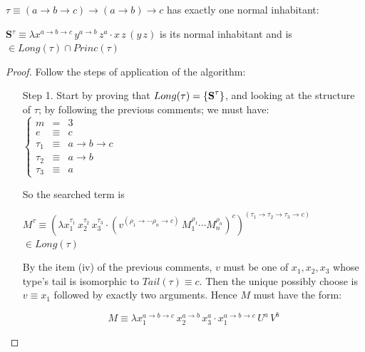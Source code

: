\documentclass[a4paper,10pt]{article}
\begin{document}
\begin{exa}[A type $\tau$ with $\#(\tau) =1$]
$\tau \equiv (a \rightarrow b \rightarrow c) \rightarrow (a\rightarrow b) \rightarrow c$ has exactly one normal inhabitant:
\begin{center}
\textbf{S}$^{\tau} \equiv \lambda x^{a \to b \to c}\,y^{a \to b}\,z^a\cdot x\,z\,(y\,z)$
is its normal inhabitant and is $\in Long(\tau) \cap Princ(\tau)$
\end{center}
\begin{proof} Follow the steps of application of the algorithm:
 \begin{itemize}
  \item[Step 1.] Start by proving that $Long(\tau) = \{\mbox{\textbf{S}}^{\tau}\}$, and looking at the structure of $\tau$; 
  by following the previous comments; we must have:\\[0.2 cm] 
  
			      $\left\{\begin{array}{lcl}
                               m & = & 3 \\
                               e & \equiv & c \\
                               \tau_1 & \equiv & a \to b \to c \\
                               \tau_2 & \equiv & a \to b \\
                               \tau_3 & \equiv & a
                              \end{array}\right.$
\vspace*{0.5 cm}
                              
So the searched term is                              
\begin{center}
$M^{\tau} \equiv (\lambda x_1^{\tau_1}\,x_2^{\tau_2}\,x_3^{\tau_3}\cdot(v^{(\rho_1 \to \cdots \rho_n \to c)}\,M_1^{\rho_1}\cdots M_n^{\rho_n})^c)^{(\tau_1 \to \tau_2 \to \tau_3 \to c)} $ 
$\in Long(\tau)$ 
\end{center}

By the item (iv) of the previous comments, $v$ must be one of $x_1, x_2, x_3$ whose type's tail is isomorphic to $Tail(\tau) \equiv c$. 
Then the unique possibly choose is $v \equiv x_1$ followed by exactly two arguments. Hence $M$ must have the form:

\begin{equation}
M \equiv \lambda x_1^{a\to b\to c}\,x_2^{a\to b}\,x_3^a \cdot x_1^{a \to b \to c}\,U^a\,V^b
\end{equation}


\end{itemize}
\end{proof}
\end{exa}
\end{document}
